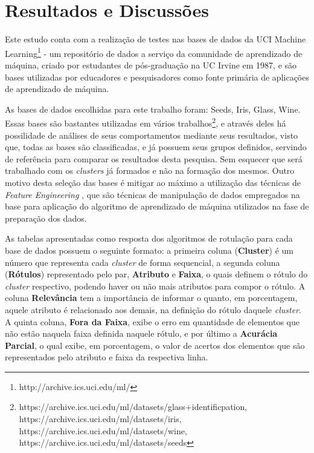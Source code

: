  \chapter{Resultados e Discussões}\label{cap:resultados}

Este estudo conta com a realização de testes nas bases de dados da UCI Machine Learning\footnote{http://archive.ics.uci.edu/ml/} - um repositório de dados a serviço da comunidade de aprendizado de máquina, criado por estudantes de pós-graduação na UC Irvine em 1987, e são bases utilizadas por educadores e pesquisadores como fonte primária de aplicações de aprendizado de máquina. 


As bases de dados escolhidas para este trabalho foram: Seeds, Iris, Glass, Wine. Essas bases são bastantes utilizadas em vários trabalhos\footnote{https://archive.ics.uci.edu/ml/datasets/glass+identificpation, https://archive.ics.uci.edu/ml/datasets/iris, https://archive.ics.uci.edu/ml/datasets/wine, https://archive.ics.uci.edu/ml/datasets/seeds}, e através deles há possilidade de análises de seus comportamentos mediante seus resultados, visto que, todas as bases são classificadas, e já possuem seus grupos definidos, servindo de referência para  comparar  os resultados desta pesquisa. Sem esquecer que será trabalhado com os \textit{clusters} já formados e não na formação dos mesmos. Outro motivo desta seleção das bases  é mitigar ao máximo a utilização das técnicas de \textit{Feature Engineering} \cite{Casari2018}, que são técnicas de manipulação de dados empregados na base para aplicação do algoritmo de aprendizado de máquina utilizados na fase de preparação dos dados.
 

As tabelas apresentadas como resposta dos algoritmos de rotulação para cada base de dados possuem o seguinte formato: a primeira coluna (\textbf{Cluster}) é um número que representa cada \textit{cluster} de forma sequencial, a segunda coluna (\textbf{Rótulos}) representado pelo par, \textbf{Atributo} e \textbf{Faixa}, o quais definem o rótulo do \textit{cluster} respectivo, podendo haver ou não mais atributos para compor o rótulo. A coluna \textbf{Relevância} tem a importância de informar o quanto, em porcentagem, aquele atributo é relacionado aos demais, na definição do rótulo daquele \textit{cluster}. A quinta coluna, \textbf{Fora da Faixa}, exibe o erro em quantidade de elementos que não estão naquela faixa definida naquele rótulo, e por último a \textbf{Acurácia Parcial}, o qual exibe, em porcentagem, o valor de acertos dos elementos que são representados pelo atributo e faixa da respectiva linha. 

